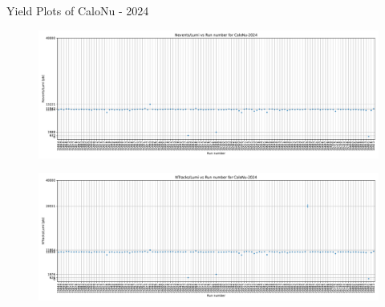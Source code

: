 \begin{frame}{Yield Plots of CaloNu - 2024}
    \begin{figure}
        \centering
        \includegraphics[width=1.0\textwidth]{plots_runwise/NEventsbyLumi_2024_CaloNu.pdf}
    \end{figure}
    \vspace{-0.35cm}
    \begin{figure}
        \centering
        \includegraphics[width=1.0\textwidth]{plots_runwise/NTracksbyLumi_2024_CaloNu.pdf}
    \end{figure}
\end{frame}

